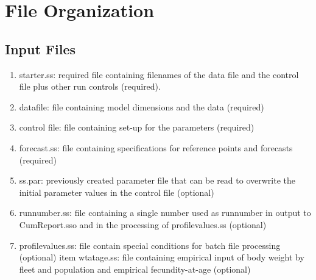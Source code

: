 		
\section{File Organization}\label{FileOrganization}		
	\subsection{Input Files}
	\begin{enumerate}
		\item starter.ss:   required file containing filenames of the data file and the control file plus other run controls (required).
		\item datafile:  file containing model dimensions and the data (required)
		\item control file:  file containing set-up for the parameters (required)
		\item forecast.ss:  file containing specifications for reference points and forecasts (required) 
		\item ss.par:  previously created parameter file that can be read to overwrite the initial parameter values in the control file (optional)
		\item runnumber.ss:  file containing a single number used as runnumber in output to CumReport.sso and in the processing of profilevalues.ss (optional)
		\item profilevalues.ss:  file contain special conditions for batch file processing (optional)
		item wtatage.ss: file containing empirical input of body weight by fleet and population and empirical fecundity-at-age (optional)
	\end{enumerate}
	
